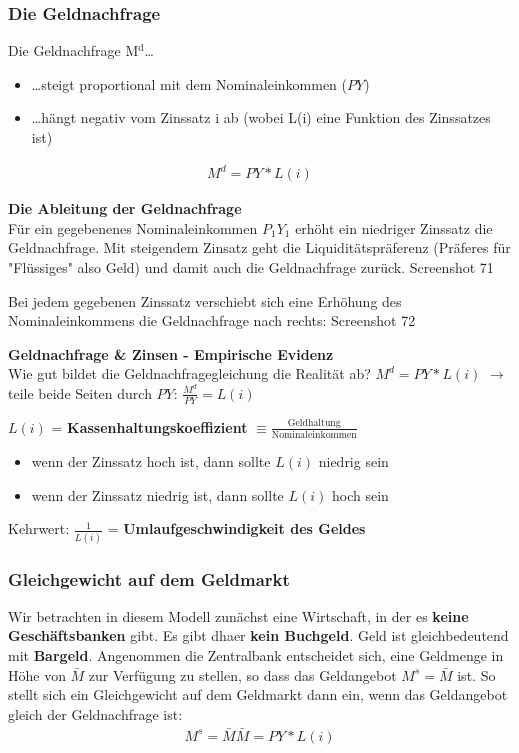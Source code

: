\documentclass[11pt]{article}
\begin{document}
\subsubsection{Die Geldnachfrage}
\label{sec:org346d251}
Die Geldnachfrage M\(^{\text{d}}\)\ldots{}
\begin{itemize}
\item \ldots{}steigt proportional mit dem Nominaleinkommen (\(PY\))
\item \ldots{}hängt negativ vom Zinssatz i ab (wobei L(i) eine Funktion des Zinssatzes ist)
\end{itemize}
\begin{equation*}
\begin{aligned}
M^d = PY*L(i)
\end{aligned}
\end{equation*}

\textbf{Die Ableitung der Geldnachfrage}\\
Für ein gegebenenes Nominaleinkommen \(P_1 Y_1\) erhöht ein niedriger Zinssatz die Geldnachfrage. 
Mit steigendem Zinsatz geht die Liquiditätspräferenz (Präferes für "Flüssiges" also Geld) und damit auch die Geldnachfrage zurück. Screenshot 71

Bei jedem gegebenen Zinssatz verschiebt sich eine Erhöhung des Nominaleinkommens die Geldnachfrage nach rechts: Screenshot 72

\textbf{Geldnachfrage \& Zinsen - Empirische Evidenz}\\
Wie gut bildet die Geldnachfragegleichung die Realität ab?
\(M^d = PY * L(i)\) \(\rightarrow\) teile beide Seiten durch \(PY\): \(\frac{M^d}{PY}=L(i)\)

\(L(i)\) = \textbf{Kassenhaltungskoeffizient} \(\equiv \frac{\text{Geldhaltung}}{\text{Nominaleinkommen}}\)
\begin{itemize}
\item wenn der Zinssatz hoch ist, dann sollte \(L(i)\) niedrig sein
\item wenn der Zinssatz niedrig ist, dann sollte \(L(i)\) hoch sein
\end{itemize}

Kehrwert: \(\frac{1}{L(i)}\) = \textbf{Umlaufgeschwindigkeit des Geldes}

\subsubsection{Gleichgewicht auf dem Geldmarkt}
\label{sec:org2176165}
Wir betrachten in diesem Modell zunächst eine Wirtschaft, in der es \textbf{keine Geschäftsbanken} gibt. Es gibt dhaer \textbf{kein Buchgeld}. Geld ist gleichbedeutend mit \textbf{Bargeld}. Angenommen die Zentralbank entscheidet sich, eine Geldmenge in Höhe von \(\bar{M}\) zur Verfügung zu stellen, so dass das Geldangebot \(M^s = \bar{M}\) ist.
So stellt sich ein Gleichgewicht auf dem Geldmarkt dann ein, wenn das Geldangebot gleich der Geldnachfrage ist:
\begin{equation*}
\begin{aligned}
M^s = \bar{M}
\bar{M} = PY * L(i)
\end{aligned}
\end{equation*}
\end{document}
